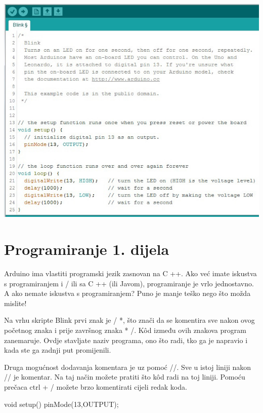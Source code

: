 \documentclass{arduino}
\begin{document}
\newpage

\begin{widebox}
    \begin{leftrightbox}[0.4]{\includegraphics[width=\linewidth]{12. Arduino code}}
    \section{Programiranje 1. dijela}

    Arduino ima vlastiti programski jezik zasnovan na C ++. Ako već imate iskustva s programiranjem i / ili sa C ++ (ili Javom), programiranje je vrlo jednostavno. A ako nemate iskustva s programiranjem? Puno je manje teško nego što možda mislite!

    Na vrhu skripte Blink prvi znak je / *, što znači da se komentira sve nakon ovog početnog znaka i prije završnog znaka * /. Kôd između ovih znakova program zanemaruje. Ovdje stavljate naziv programa, ono što radi, tko ga je napravio i kada ste ga zadnji put promijenili.
    \end{leftrightbox}
\end{widebox}

\smallskip

Druga mogućnost dodavanja komentara je uz pomoć //. Sve u istoj liniji nakon // je komentar. Na taj način možete pratiti što kôd radi na toj liniji. Pomoću prečaca ctrl + / možete brzo komentirati cijeli redak koda.
\begin{marginlisting}
void setup(){
  pinMode(13,OUTPUT);
}
\end{marginlisting}
\end{document}
